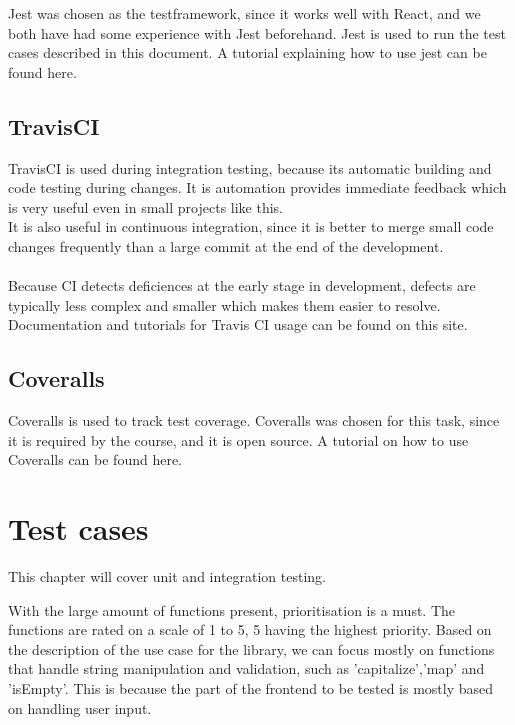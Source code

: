 \documentclass[a4paper, 12pt]{article}
\begin{document}
    Jest\cite{Jest} was chosen as the testframework, since it works well with React, and we both have had some experience with Jest beforehand.
    Jest is used to run the test cases described in this document. A tutorial explaining how to use jest can be found here.\cite{JestTutorial}

    \subsection{TravisCI}
    
    TravisCI\cite{Travis} is used during integration testing, because its automatic building and code testing during changes. It is automation provides immediate feedback which 
    is very useful even in small projects like this.
    \\
     It is also useful in continuous integration, since it is better to merge small code changes frequently than a large commit at 
    the end of the development.
    \\
    \\
     Because CI detects deficiences at the early stage in development, defects are typically less complex and smaller which makes them easier to resolve.
    Documentation and tutorials for Travis CI usage can be found on this site. \cite{TravisTutorial}

    \subsection{Coveralls}

    Coveralls\cite{coveralls} is used to track test coverage. Coveralls was chosen for this task, since it is required by the course, and it is open source. 
    A tutorial on how to use Coveralls can be found here\cite{coverallsTutorial}.

\section{Test cases}
This chapter will cover unit and integration testing.

With the large amount of functions present, prioritisation is a must. The functions are rated on a scale of 1 to 5, 5 having the highest priority.
Based on the description of the use case for the library, we can focus mostly on functions that handle string manipulation and validation,
such as 'capitalize','map' and 'isEmpty'. This is because the part of the frontend to be tested  is mostly based on handling user input.
\\\\
\end{document}

